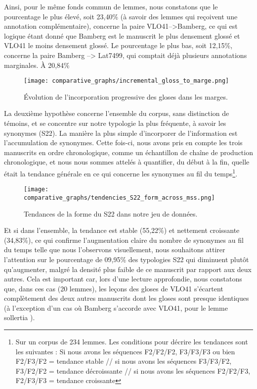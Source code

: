\documentclass[a4paper, twoside, 12pt]{book}
\begin{document}
{Ainsi, pour le même \og{}fonds commun de lemmes\fg{}, nous constatons que le pourcentage le plus élevé, soit 23,40\% (à savoir des lemmes qui reçoivent une annotation complémentaire), concerne la paire VLO41-->Bamberg, ce qui est logique étant donné que Bamberg est le manuscrit le plus densement glossé et VLO41 le moins densement glossé. Le pourcentage le plus bas, soit 12,15\%, concerne la paire Bamberg --> Lat7499, qui comptait déjà plusieurs annotations marginales. À 20,84\% \\


\begin{figure}[H]
\centering
\texttt{[image: comparative\_graphs/incremental\_gloss\_to\_marge.png]}
\caption{Évolution de l'incorporation progressive des gloses dans les marges.}
\label{fig:incrementalgloss}
\end{figure}

La deuxième hypothèse concerne l'ensemble du corpus, sans distinction de témoins, et se concentre sur notre typologie la plus fréquente, à savoir les synonymes (S22). La manière la plus simple d'incorporer de l'information est l'accumulation de synonymes. Cette fois-ci, nous avons pris en compte  les trois manuscrits en ordre chronologique, comme un échantillon de \og{}chaîne de production chronologique\fg{}, et nous nous sommes attelés à quantifier, \og{}du début à la fin\fg{}, quelle était la tendance générale en ce qui concerne les synonymes au fil du temps\footnote{Sur un corpus de 234 lemmes. Les conditions pour décrire les tendances sont les suivantes : Si nous avons les séquences F2/F2/F2, F3/F3/F3 ou bien F2/F3/F2 = tendance stable // si nous avons les séquences F3/F3/F2, F3/F2/F2 = tendance décroissante // si nous avons les séquences F2/F2/F3, F2/F3/F3 = tendance croissante}.\\

\begin{figure}[H]
\centering
\texttt{[image: comparative\_graphs/tendencies\_S22\_form\_across\_mss.png]}
\caption{Tendances de la forme du S22 dans notre jeu de données.}
\label{fig:incrementalS22}
\end{figure}


Et si dans l'ensemble, la tendance est stable (55,22\%) et nettement croissante (34,83\%), ce qui confirme l'augmentation claire du nombre de synonymes au fil du temps telle que nous l'observons visuellement, nous souhaitons attirer l'attention sur le pourcentage de 09,95\% des typologies S22 qui diminuent plutôt qu'augmenter, malgré la densité plus faible de ce manuscrit par rapport aux deux autres. Cela est important car, lors d'une lecture approfondie, nous constatons que, dans ces cas (20 lemmes), les leçons des gloses de VLO41 s'écartent complètement des deux autres manuscrits dont les gloses sont presque identiques (à l'exception d'un cas où Bamberg s'accorde avec VLO41, pour le lemme \og{}sollertia\fg{} ).\\

}
\end{document}
